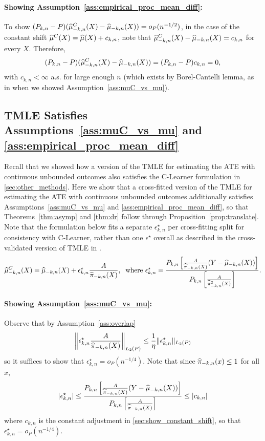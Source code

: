 \paragraph{Showing Assumption~\ref{ass:empirical_proc_mean_diff}:}
To show $(P_{k,n}-P)(  \widehat{\mu}_{-k,n}^C(X)- \widehat{\mu}_{-k,n}(X)) =o_P(n^{-1/2})$, 
in the case of the constant shift $\widehat{\mu}^C(X)=\widehat{\mu}(X)+c_{k,n}$, 
note that  $\widehat{\mu}^C_{-k,n}(X)-\widehat{\mu}_{-k,n}(X) = c_{k,n}$ for every $X$. Therefore, $$
(P_{k,n}-P)(  \widehat{\mu}_{-k,n}^C(X)- \widehat{\mu}_{-k,n}(X)) = (P_{k,n}-P)c_{k,n} = 0,
$$
with $c_{k,n} < \infty$ a.s. for large enough $n$ (which exists by Borel-Cantelli lemma, as in when we showed Assumption~\ref{ass:muC_vs_mu}). 



\subsection{TMLE Satisfies Assumptions~\ref{ass:muC_vs_mu} and \ref{ass:empirical_proc_mean_diff}}
\label{sec:show_tmle}
Recall that we showed how a version of the TMLE for estimating the ATE with continuous unbounded outcomes also satisfies the C-Learner formulation in \cref{sec:other_methods}. 
Here we show that a cross-fitted version of the TMLE for estimating the ATE with continuous unbounded outcomes additionally satisfies Assumptions~\ref{ass:muC_vs_mu} and \ref{ass:empirical_proc_mean_diff}, so that Theorems~\ref{thm:asymp} and \ref{thm:dr} follow through Proposition~\ref{prop:translate}. 
Note that the formulation below fits a separate $\epsilon^\star_{k,n}$ per cross-fitting split for consistency with C-Learner, rather than one $\epsilon^\star$ overall as described in the cross-validated version of TMLE in \citep{VanDerLaanRo11}. 
$$
\widehat{\mu}^{C}_{-k,n}(X) = \widehat{\mu}_{-k,n}(X) + \epsilon^\star_{k,n}\frac{A}{\widehat{\pi}_{-k,n}(X)}, \; \text{ where } \epsilon^\star_{k,n} = \frac{P_{k,n}\left[\frac{A}{\widehat{\pi}_{-k,n}(X)}(Y-\widehat{\mu}_{-k,n}(X))\right]}{P_{k,n}\left[\frac{A}{\widehat{\pi}_{-k,n}^2(X)}\right]}.
$$
\paragraph{Showing Assumption~\ref{ass:muC_vs_mu}:}
Observe that by Assumption~\ref{ass:overlap}
$$
\left\|\epsilon_{k,n}^\star\frac{A}{\widehat{\pi}_{-k,n}(X)}\right\|_{L_2(P)} \leq \frac{1}{\eta}\|\epsilon_{k,n}^\star\|_{L_2(P)}
$$
so it suffices to show that $\epsilon_{k,n}^\star=o_P(n^{-1/4})$.
Note that since $\widehat{\pi}_{-k,n}(x) \leq 1$ for all $x$,
\begin{align}
\label{eq:eps}    
|\epsilon_{k,n}^\star| \leq %
\frac{P_{k,n}\left[\frac{A}{\what\pi_{-k,n}(X)}(Y-\what\mu_{-k,n}(X))\right]}{P_{k,n}\left[\frac{A}{\what\pi_{-k,n}(X)}\right]}
\leq |c_{k,n}|
\end{align}
where $c_{k,n}$ is the constant adjustment in \cref{sec:show_constant_shift}, 
so that $\epsilon^\star_{k,n}=o_P(n^{-1/4})$. 


